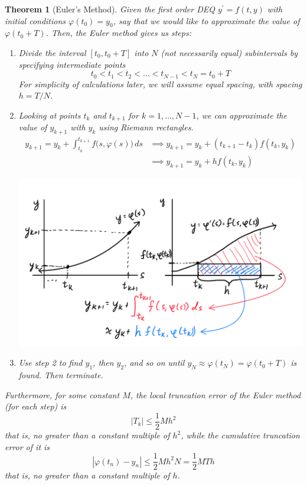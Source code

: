 \documentclass{article}
\newtheorem{theorem}{Theorem}[section]
\theoremstyle{remark}
\theoremstyle{definition}
\begin{document}
\begin{theorem}[Euler's Method]
Given the first order DEQ $y^\prime = f(t, y)$ with initial conditions $\varphi(t_0) = y_0$, say that we would like to approximate the value of $\varphi(t_0 + T)$. Then, the \textit{Euler method} gives us steps: 
\begin{enumerate}
    \item Divide the interval $[t_0, t_0 + T]$ into $N$ (not necessarily equal) subintervals by specifying intermediate points
    \[t_0 < t_1 < t_2 < \ldots < t_{N-1} < t_N = t_0 + T\]
    For simplicity of calculations later, we will assume equal spacing, with spacing $h = T/N$. 
    \item Looking at points $t_k$ and $t_{k+1}$ for $k = 1, \ldots, N-1$, we can approximate the value of $y_{k+1}$ with $y_k$ using Riemann rectangles. 
    \begin{align*}
        y_{k+1} = y_k + \int_{t_k}^{t_{k+1}} f\big(s, \varphi(s)\big)\,ds  & \implies y_{k+1} = y_k + (t_{k+1} - t_k) f(t_k, y_k) \\
        & \implies y_{k+1} = y_k + h f(t_k, y_k)
    \end{align*}
    \begin{center}
        \includegraphics[scale=0.25]{img/Eulers_Method.PNG}
    \end{center}
    \item Use step 2 to find $y_1$, then $y_2$, and so on until $y_N \approx \varphi(t_N) = \varphi(t_0 + T)$ is found. Then terminate. 
\end{enumerate}
Furthermore, for some constant $M$, the local truncation error of the Euler method (for each step) is 
\[|T_k| \leq \frac{1}{2} M h^2\]
that is, no greater than a constant multiple of $h^2$, while the cumulative truncation error of it is
\[|\varphi(t_n) - y_n| \leq \frac{1}{2} M h^2 N = \frac{1}{2} M T h\]
that is, no greater than a constant multiple of $h$. 
\end{theorem}
\end{document}
